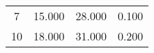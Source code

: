 % 
\begin{tabular}{cccc}
  \hline
  \hline
7 & 15.000 & 28.000 & 0.100 \\ 
  10 & 18.000 & 31.000 & 0.200 \\ 
   \hline
\end{tabular}
